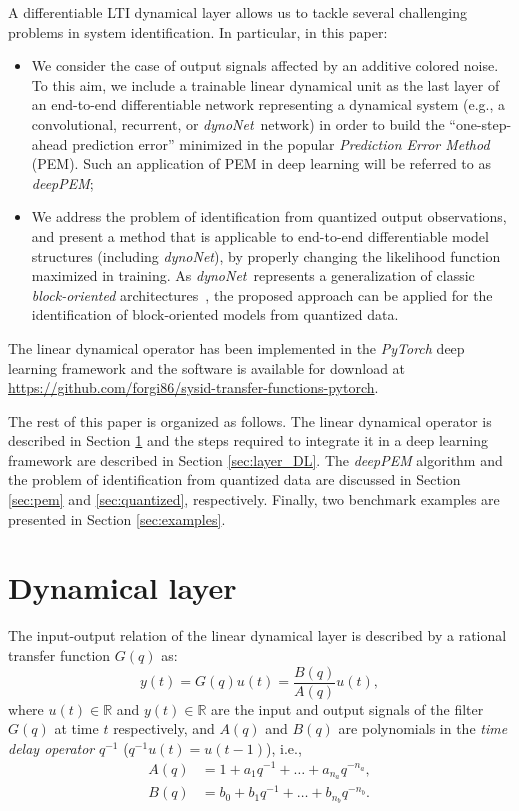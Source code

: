 \documentclass{article}
\newcommand{\R}{\mathbb{R}} %
\newcommand{\q}{q} %
\newcommand{\A}{A} %
\newcommand{\ac}{a} %
\newcommand{\B}{B} %
\newcommand{\bb}{b} %
\newcommand{\Name}{\emph{dynoNet}}
\begin{document}
    A differentiable LTI dynamical layer allows us to tackle several challenging problems in system identification. In particular,  in this paper:
  \begin{itemize}
  	\item   We consider the case of output signals affected by an additive colored noise. To this aim, we include  a trainable linear dynamical unit as {the} last layer of an end-to-end differentiable network representing a dynamical system (e.g., a convolutional, recurrent, or \Name\ network) in order to build the ``one-step-ahead prediction error'' minimized in the popular \emph{Prediction Error Method} (PEM).  Such an application of PEM in deep learning will be referred to as \emph{deepPEM};
  	\item We address the problem of identification from quantized output observations, and present a method 
  	that is applicable to end-to-end differentiable model structures (including \Name), by properly changing the likelihood function maximized in training. As  \Name \ represents a 
  	generalization of classic \emph{block-oriented} architectures~\cite{giri2010block}, the proposed approach can be applied for {the} identification of block-oriented models from quantized data.
  \end{itemize}
  
  
  The linear dynamical operator has been implemented in the  \emph{PyTorch} deep learning framework
   and the software is available for download at  \url{https://github.com/forgi86/sysid-transfer-functions-pytorch}.


The rest of this paper is organized as follows. The linear dynamical operator is described in Section \ref{sec:LTI} and the steps required to integrate it in a deep learning framework are described in Section \ref{sec:layer_DL}. The \emph{deepPEM} algorithm and the problem of identification from quantized data are discussed in Section \ref{sec:pem} and \ref{sec:quantized}, respectively. Finally, two benchmark  examples are presented in Section \ref{sec:examples}. 


\section{Dynamical layer} \label{sec:LTI}
The input-output relation of the linear dynamical layer is described by a rational transfer function $G(q)$ as:
	\begin{equation} \label{eqn:filter} %
	y(t) = G(\q) u(t) =  \frac{\B(\q)}{\A(\q)}u(t), %
	\end{equation}
	where 	  $u(t) \in \R$ and  $y(t) \in \R$ are the input and output signals of the filter $G(q)$ at time  $t$ {respectively}, 	and 
	 $A(q)$ and $B(q)$ are polynomials in the \emph{time delay operator}  $\q^{-1}$ ($q^{-1}u(t)=u(t-1)$), i.e., 
\begin{subequations}
	\begin{align}
	\A(q) &= 1 + \ac_1 \q^{-1} + \dots + \ac_{n_\ac}q^{-n_\ac}, \\
	\B(q) &= \bb_0 + \bb_1 \q^{-1} + \dots + \bb_{n_{\bb}}q^{-n_{\bb}}.
	\end{align}
\end{subequations}
\end{document}
